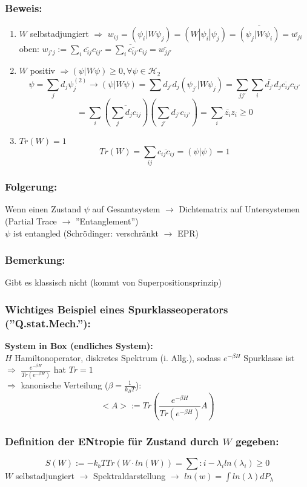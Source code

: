 \documentclass[twoside,a4paper]{scrartcl}
\renewcommand{\1}{\mathds{1}}
\newcommand{\Ra}{\Rightarrow}
\newcommand{\ra}{\rightarrow}
\renewcommand{\l}{\lambda}
\renewcommand{\H}{\mathcal{H}}
\begin{document}
\subsubsection*{Beweis:} 
\begin{enumerate}
\item $W$ selbstadjungiert $\Ra$ $w_{ij}=(\psi_i|W\psi_j)=(W|\psi_i|\psi_j)=\overline{(\psi_j|W\psi_i)}= \overline{w_{ji}}$\\
oben: $w_{j'j}:=\sum_i \overline{c_{ij}}c_{ij'}= \overline{\sum_i \overline{c_{ij'}}c_{ij}}=\overline{w_{jj'}}$
\item $W$ positiv $\Ra (\psi|W\psi) \geq 0, \forall \psi \in \H_2$\\
$$\psi=\sum_j d_j \psi_j^{(2)} \ra (\psi|W\psi)=\sum d_{j'}d_j (\psi_{j'}|W\psi_j)=\sum_{jj'} \sum_i \overline{d_{j'}}d_j \overline{c_{ij}}c_{ij'}$$
$$=\sum_i (\overline{\sum_j d_j c_{ij}}) (\sum_{j'} d_{j'}c_{ij'})=\sum_i \overline{z_i}z_i \geq 0$$
\item $Tr(W)=1$\\
$$Tr(W)=\sum_{ij} \overline{c_{ij}c_{ij}}=(\psi|\psi)=1$$
\end{enumerate}
\subsubsection*{Folgerung:} 
Wenn einen Zustand $\psi$ auf Gesamtsystem $\ra$ Dichtematrix auf Untersystemen (Partial Trace $\ra$ ''Entanglement'')\\
$\psi$ ist entangled (Schrödinger: verschränkt $\ra$ EPR)
\subsubsection*{Bemerkung:} 
Gibt es klassisch nicht (kommt von Superpositionsprinzip)
\subsubsection*{Wichtiges Beispiel eines Spurklasseoperators (''Q.stat.Mech.''):} 
\textbf{System in Box (endliches System):}\\
$H$ Hamiltonoperator, diskretes Spektrum (i. Allg.), sodass $e^{-\beta H}$ Spurklasse ist $\Ra$ $\frac{e^{-\beta H}}{Tr(e^{-\beta H})}$ hat $Tr=1$\\
$\Ra$ kanonische Verteilung ($\beta=\frac{1}{k_B T}$):
$$<A>:= Tr(\frac{e^{-\beta H}}{Tr(e^{-\beta H})}A)$$
\subsubsection*{Definition der ENtropie für Zustand durch $W$ gegeben:} 
$$S(W):=-k_b T Tr(W \cdot ln(W))=\sum:i -\l_i ln(\l_i)\geq 0$$
$W$ selbstadjungiert $\ra$ Spektraldarstellung $\ra$ $ln(w)=\int ln(\l) dP_\l$
\end{document}
